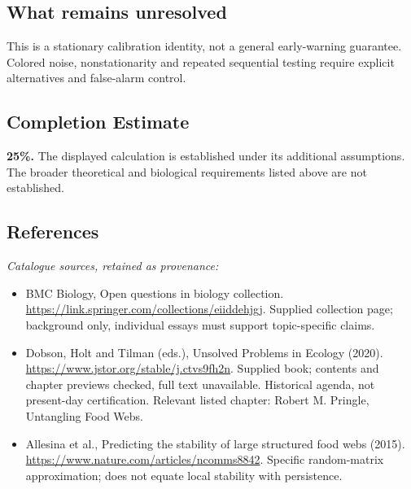 \documentclass[11pt]{article}
\begin{document}
\subsection{What remains unresolved}
This is a stationary calibration identity, not a general early-warning guarantee. Colored noise, nonstationarity and repeated sequential testing require explicit alternatives and false-alarm control.
\subsection{Completion Estimate}
\textbf{25\%.} The displayed calculation is established under its additional assumptions. The broader theoretical and biological requirements listed above are not established.
\subsection{References}
\noindent\emph{Catalogue sources, retained as provenance:}
\begin{itemize}
\item BMC Biology, Open questions in biology collection. \url{https://link.springer.com/collections/eiiddehjgj}. Supplied collection page; background only, individual essays must support topic-specific claims.
\item Dobson, Holt and Tilman (eds.), Unsolved Problems in Ecology (2020). \url{https://www.jstor.org/stable/j.ctvs9fh2n}. Supplied book; contents and chapter previews checked, full text unavailable. Historical agenda, not present-day certification. Relevant listed chapter: Robert M. Pringle, Untangling Food Webs.
\item Allesina et al., Predicting the stability of large structured food webs (2015). \url{https://www.nature.com/articles/ncomms8842}. Specific random-matrix approximation; does not equate local stability with persistence.
\end{itemize}
\clearpage


\appendix
\end{document}
